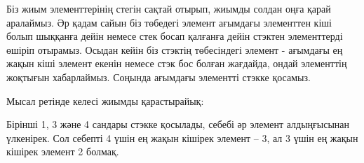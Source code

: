 Біз жиым элементтерінің стегін сақтай отырып, жиымды солдан оңға қарай аралаймыз.
Әр қадам сайын біз төбедегі элемент ағымдағы элементтен кіші болып шыққанға дейін немесе стек босап қалғанға дейін стэктен элементтерді өшіріп отырамыз. Осыдан кейін біз стэктің төбесіндегі элемент - ағымдағы ең жақын кіші элемент екенін немесе стэк бос 
болған жағдайда, ондай элементтің жоқтығын хабарлаймыз.
Соңында ағымдағы элементті стэкке қосамыз.

Мысал ретінде келесі жиымды қарастырайық: 
\begin{center}
\end{center}

Бірінші 1, 3 және 4 сандары стэкке қосылады, себебі әр элемент алдыңғысынан үлкенірек.
Сол себепті 4 үшін ең жақын кішірек элемент -- 3, ал 3 үшін ең жақын кішірек элемент 2 болмақ.
\begin{center}
\end{center}

